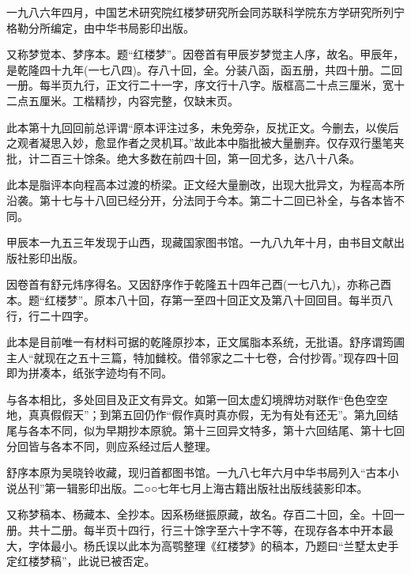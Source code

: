 一九八六年四月，中国艺术研究院红楼梦研究所会同苏联科学院东方学研究所列宁格勒分所编定，由中华书局影印出版。

{}

又称梦觉本、梦序本。题``红楼梦''。因卷首有甲辰岁梦觉主人序，故名。甲辰年，是乾隆四十九年(一七八四)。存八十回，全。分装八函，函五册，共四十册。二回一册。每半页九行，正文行二十一字，序文行十八字。版框高二十点三厘米，宽十二点五厘米。工楷精抄，内容完整，仅缺末页。

此本第十九回回前总评谓``原本评注过多，未免旁杂，反扰正文。今删去，以俟后之观者凝思入妙，愈显作者之灵机耳。''故此本中脂批被大量删弃。仅存双行墨笔夹批，计二百三十馀条。绝大多数在前四十回，第一回尤多，达八十八条。

此本是脂评本向程高本过渡的桥梁。正文经大量删改，出现大批异文，为程高本所沿袭。第十七与十八回已经分开，分法同于今本。第二十二回已补全，与各本皆不同。

甲辰本一九五三年发现于山西，现藏国家图书馆。一九八九年十月，由书目文献出版社影印出版。

{}

因卷首有舒元炜序得名。又因舒序作于乾隆五十四年己酉(一七八九)，亦称己酉本。题``红楼梦''。原本八十回，存第一至四十回正文及第八十回回目。每半页八行，行二十四字。

此本是目前唯一有材料可据的乾隆原抄本，正文属脂本系统，无批语。舒序谓筠圃主人``就现在之五十三篇，特加雠校。借邻家之二十七卷，合付抄胥。''现存四十回即为拼凑本，纸张字迹均有不同。

与各本相比，多处回目及正文有异文。如第一回太虚幻境牌坊对联作``色色空空地，真真假假天''；到第五回仍作``假作真时真亦假，无为有处有还无''。第九回结尾与各本不同，似为早期抄本原貌。第十三回异文特多，第十六回结尾、第十七回分回皆与各本不同，则应系经过后人整理。

舒序本原为吴晓铃收藏，现归首都图书馆。一九八七年六月中华书局列入``古本小说丛刊''第一辑影印出版。二○○七年七月上海古籍出版社出版线装影印本。

{}

又称梦稿本、杨藏本、全抄本。因系杨继振原藏，故名。存百二十回，全。十回一册。共十二册。每半页十四行，行三十馀字至六十字不等，在现存各本中开本最大，字体最小。杨氏误以此本为高鹗整理《红楼梦》的稿本，乃题曰``兰墅太史手定红楼梦稿''，此说已被否定。

